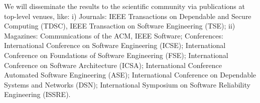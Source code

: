 \documentclass[12pt]{article}
\begin{document}
 We will disseminate the results to the scientific community via publications at top-level venues, like: i) Journals: IEEE Transactions on Dependable and Secure Computing (TDSC), IEEE Transaction on Software Engineering (TSE); 
ii) Magazines: Communications of the ACM, IEEE Software; Conferences: 
International Conference on Software Engineering (ICSE);  International Conference on Foundations of Software Engineering (FSE); International Conference on Software Architecture (ICSA); International Conference 
Automated Software Engineering (ASE); International Conference on Dependable Systems and Networks (DSN); International Symposium on Software Reliability Engineering (ISSRE).

%




\vspace{-.2cm}
\end{document}
